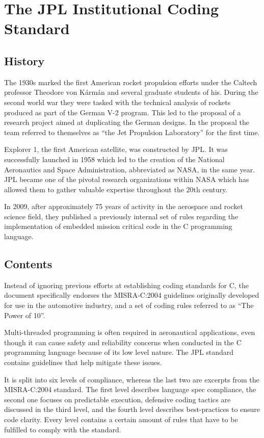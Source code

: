 \section{The JPL Institutional Coding Standard}
\subsection{History}
The 1930s marked the first American rocket propulsion efforts under the Caltech professor Theodore von Kármán and several graduate students of his. During the second world war they were tasked with the technical analysis of rockets produced as part of the German V-2 program. This led to the proposal of a research project aimed at duplicating the German designs. In the proposal the team referred to themselves as “the Jet Propulsion Laboratory” for the first time.

Explorer 1, the first American satellite, was constructed by JPL. It was successfully launched in 1958 which led to the creation of the National Aeronautics and Space Administration, abbreviated as NASA, in the same year. JPL became one of the pivotal research organizations within NASA which has allowed them to gather valuable expertise throughout the 20th century. 

In 2009, after approximately 75 years of activity in the aerospace and rocket science field, they published a previously internal set of rules regarding the implementation of embedded mission critical code in the C programming language. 

\subsection{Contents}
Instead of ignoring previous efforts at establishing coding standards for C, the document specifically endorses the MISRA-C:2004 guidelines originally developed for use in the automotive industry, and a set of coding rules referred to as “The Power of 10”. 

Multi-threaded programming is often required in aeronautical applications, even though it can cause safety and reliability concerns when conducted in the C programming language because of its low level nature. The JPL standard contains guidelines that help mitigate these issues.

It is split into six levels of compliance, whereas the last two are excerpts from the MISRA-C:2004 standard. The first level describes language spec compliance, the second one focuses on predictable execution, defensive coding tactics are discussed in the third level, and the fourth level describes best-practices to ensure code clarity. Every level contains a certain amount of rules that have to be fulfilled to comply with the standard.

